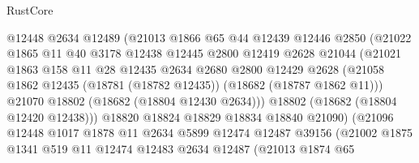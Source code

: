 \begin{lexlean}{RustCore}
\begin{coremodule}
                          @12448
                          @2634
                          @12489
                          (@21013
                            @1866
                            @65
                            @44
                            @12439
                            @12446
                            @2850
                            (@21022
                              @1865
                              @11
                              @40
                              @3178
                              @12438
                              @12445
                              @2800
                              @12419
                              @2628
                              @21044
                              (@21021
                                @1863
                                @158
                                @11
                                @28
                                @12435
                                @2634
                                @2680
                                @2800
                                @12429
                                @2628
                                (@21058
                                  @1862
                                  @12435
                                  (@18781 (@18782 @12435))
                                  (@18682 (@18787 @1862 @11)))
                                @21070
                                @18802
                                (@18682 (@18804 @12430 @2634)))
                              @18802
                              (@18682 (@18804 @12420 @12438)))
                            @18820
                            @18824
                            @18829
                            @18834
                            @18840
                            @21090)
                          (@21096
                            @12448
                            @1017
                            @1878
                            @11
                            @2634
                            @5899
                            @12474
                            @12487
                            @39156
                            (@21002
                              @1875
                              @1341
                              @519
                              @11
                              @12474
                              @12483
                              @2634
                              @12487
                              (@21013
                                @1874
                                @65

\end{coremodule}
\end{lexlean}
